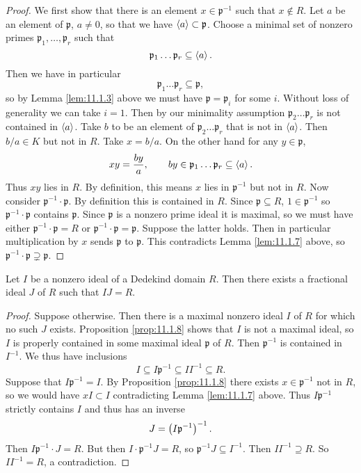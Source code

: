 \begin{proof}
We first show that there is an element $ x \in \mathfrak{p}^{-1} $ such that $ x \notin R $. Let $ a $ be an element of $ \mathfrak{p} $, $ a \ne 0 $, so that we have $ \left\langle a \right\rangle \subset \mathfrak{p} $. Choose a minimal set of nonzero primes $ \mathfrak{p}_1, \dots, \mathfrak{p}_r $ such that
$$ \mathfrak{p}_1 \dots \mathfrak{p}_r \subseteq \left\langle a \right\rangle. $$
Then we have in particular
$$ \mathfrak{p}_1 \dots \mathfrak{p}_r \subseteq \mathfrak{p}, $$
so by Lemma \ref{lem:11.1.3} above we must have $ \mathfrak{p} = \mathfrak{p}_i $ for some $ i $. Without loss of generality we can take $ i = 1 $. Then by our minimality assumption $ \mathfrak{p}_2 \dots \mathfrak{p}_r $ is not contained in $ \left\langle a \right\rangle $. Take $ b $ to be an element of $ \mathfrak{p}_2 \dots \mathfrak{p}_r $ that is not in $ \left\langle a \right\rangle $. Then $ b / a \in K $ but not in $ R $. Take $ x = b / a $. On the other hand for any $ y \in \mathfrak{p} $,
$$ xy = \dfrac{by}{a}, \qquad by \in \mathfrak{p}_1 \dots \mathfrak{p}_r \subseteq \left\langle a \right\rangle. $$
Thus $ xy $ lies in $ R $. By definition, this means $ x $ lies in $ \mathfrak{p}^{-1} $ but not in $ R $. Now consider $ \mathfrak{p}^{-1} \cdot \mathfrak{p} $. By definition this is contained in $ R $. Since $ \mathfrak{p} \subseteq R $, $ 1 \in \mathfrak{p}^{-1} $ so $ \mathfrak{p}^{-1} \cdot \mathfrak{p} $ contains $ \mathfrak{p} $. Since $ \mathfrak{p} $ is a nonzero prime ideal it is maximal, so we must have either $ \mathfrak{p}^{-1} \cdot \mathfrak{p} = R $ or $ \mathfrak{p}^{-1} \cdot \mathfrak{p} = \mathfrak{p} $. Suppose the latter holds. Then in particular multiplication by $ x $ sends $ \mathfrak{p} $ to $ \mathfrak{p} $. This contradicts Lemma \ref{lem:11.1.7} above, so $ \mathfrak{p}^{-1} \cdot \mathfrak{p} \supsetneq \mathfrak{p} $.
\end{proof}

\begin{proposition}
\label{prop:11.1.9}
Let $ I $ be a nonzero ideal of a Dedekind domain $ R $. Then there exists a fractional ideal $ J $ of $ R $ such that $ IJ = R $.
\end{proposition}

\begin{proof}
Suppose otherwise. Then there is a maximal nonzero ideal $ I $ of $ R $ for which no such $ J $ exists. Proposition \ref{prop:11.1.8} shows that $ I $ is not a maximal ideal, so $ I $ is properly contained in some maximal ideal $ \mathfrak{p} $ of $ R $. Then $ \mathfrak{p}^{-1} $ is contained in $ I^{-1} $. We thus have inclusions
$$ I \subseteq I\mathfrak{p}^{-1} \subseteq II^{-1} \subseteq R. $$
Suppose that $ I\mathfrak{p}^{-1} = I $. By Proposition \ref{prop:11.1.8} there exists $ x \in \mathfrak{p}^{-1} $ not in $ R $, so we would have $ xI \subset I $ contradicting Lemma \ref{lem:11.1.7} above. Thus $ I\mathfrak{p}^{-1} $ strictly contains $ I $ and thus has an inverse
$$ J = \left( I\mathfrak{p}^{-1} \right)^{-1}. $$
Then $ I\mathfrak{p}^{-1} \cdot J = R $. But then $ I \cdot \mathfrak{p}^{-1}J = R $, so $ \mathfrak{p}^{-1}J \subseteq I^{-1} $. Then $ II^{-1} \supseteq R $. So $ II^{-1} = R $, a contradiction.
\end{proof}

